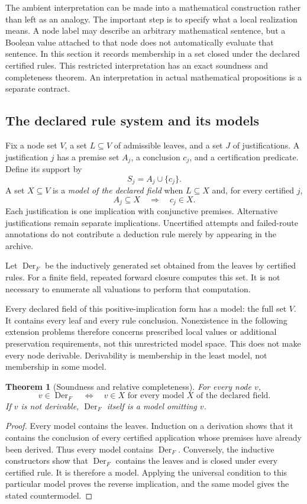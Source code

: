 \documentclass[11pt,oneside]{article}
\theoremstyle{komorebiplain}
\newtheorem{theorem}{Theorem}[section]
\theoremstyle{komorebidefinition}
\theoremstyle{komorebiremark}
\begin{document}
The ambient interpretation can be made into a mathematical construction rather than left as an analogy. The important step is to specify what a local realization means. A node label may describe an arbitrary mathematical sentence, but a Boolean value attached to that node does not automatically evaluate that sentence. In this section it records membership in a set closed under the declared certified rules. This restricted interpretation has an exact soundness and completeness theorem. An interpretation in actual mathematical propositions is a separate contract.

\subsection{The declared rule system and its models}

Fix a node set $V$, a set $L\subseteq V$ of admissible leaves, and a set $J$ of justifications. A justification $j$ has a premise set $A_j$, a conclusion $c_j$, and a certification predicate. Define its support by
\[
S_j=A_j\cup\{c_j\}.
\]
A set $X\subseteq V$ is a \emph{model of the declared field} when $L\subseteq X$ and, for every certified $j$,
\[
A_j\subseteq X\quad\Longrightarrow\quad c_j\in X.
\]
Each justification is one implication with conjunctive premises. Alternative justifications remain separate implications. Uncertified attempts and failed-route annotations do not contribute a deduction rule merely by appearing in the archive.

Let $\operatorname{Der}_F$ be the inductively generated set obtained from the leaves by certified rules. For a finite field, repeated forward closure computes this set. It is not necessary to enumerate all valuations to perform that computation.

Every declared field of this positive-implication form has a model: the full set $V$. It contains every leaf and every rule conclusion. Nonexistence in the following extension problems therefore concerns prescribed local values or additional preservation requirements, not this unrestricted model space. This does not make every node derivable. Derivability is membership in the least model, not membership in some model.

\begin{theorem}[Soundness and relative completeness]
\label{res:24:1}
\label{thm:relative-completeness}
For every node $v$,
\[
v\in\operatorname{Der}_F
\quad\Longleftrightarrow\quad
\text{$v\in X$ for every model $X$ of the declared field}.
\]
If $v$ is not derivable, $\operatorname{Der}_F$ itself is a model omitting $v$.
\end{theorem}
\begin{proof}
Every model contains the leaves. Induction on a derivation shows that it contains the conclusion of every certified application whose premises have already been derived. Thus every model contains $\operatorname{Der}_F$. Conversely, the inductive constructors show that $\operatorname{Der}_F$ contains the leaves and is closed under every certified rule. It is therefore a model. Applying the universal condition to this particular model proves the reverse implication, and the same model gives the stated countermodel.
\end{proof}
\end{document}
